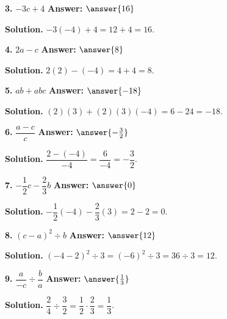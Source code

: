 \documentclass{ximera}
\begin{document}
\begin{problem}
\textbf{3.} $-3c+4$ \qquad \textbf{Answer:} $\answer{16}$

\begin{hint}
\textbf{Solution.} $-3(-4)+4=12+4=16$.
\end{hint}
\end{problem}

\begin{problem}
\textbf{4.} $2a-c$ \qquad \textbf{Answer:} $\answer{8}$

\begin{hint}
\textbf{Solution.} $2(2)-(-4)=4+4=8$.
\end{hint}
\end{problem}

\begin{problem}
\textbf{5.} $ab+abc$ \qquad \textbf{Answer:} $\answer{-18}$

\begin{hint}
\textbf{Solution.} $(2)(3)+(2)(3)(-4)=6-24=-18$.
\end{hint}
\end{problem}

\begin{problem}
\textbf{6.} $\dfrac{a-c}{c}$ \qquad \textbf{Answer:} $\answer{-\frac{3}{2}}$

\begin{hint}
\textbf{Solution.} $\dfrac{2-(-4)}{-4}=\dfrac{6}{-4}=-\dfrac{3}{2}$.
\end{hint}
\end{problem}

\begin{problem}
\textbf{7.} $-\dfrac{1}{2}c-\dfrac{2}{3}b$ \qquad \textbf{Answer:} $\answer{0}$

\begin{hint}
\textbf{Solution.} $-\dfrac{1}{2}(-4)-\dfrac{2}{3}(3)=2-2=0$.
\end{hint}
\end{problem}

\begin{problem}
\textbf{8.} $(c-a)^{2} \div b$ \qquad \textbf{Answer:} $\answer{12}$

\begin{hint}
\textbf{Solution.} $(-4-2)^{2}\div 3=(-6)^{2}\div 3=36\div 3=12$.
\end{hint}
\end{problem}

\begin{problem}
\textbf{9.} $\dfrac{a}{-c} \div \dfrac{b}{a}$ \qquad \textbf{Answer:} $\answer{\frac{1}{3}}$

\begin{hint}
\textbf{Solution.} $\dfrac{2}{4}\div\dfrac{3}{2}=\dfrac{1}{2}\cdot\dfrac{2}{3}=\dfrac{1}{3}$.
\end{hint}
\end{problem}
\end{document}
